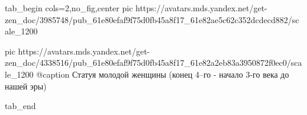  
 
 
 
 


\ifcmt
  tab_begin cols=2,no_fig,center
     pic https://avatars.mds.yandex.net/get-zen_doc/3985748/pub_61e80efaf9f75d0fb45a8f17_61e82ae5c62c352dcdecd882/scale_1200

     pic https://avatars.mds.yandex.net/get-zen_doc/4338516/pub_61e80efaf9f75d0fb45a8f17_61e82a2eb83a3950872f0ec0/scale_1200
     @caption Статуя молодой женщины (конец 4–го - начало 3-го века до нашей эры)

  tab_end
\fi
